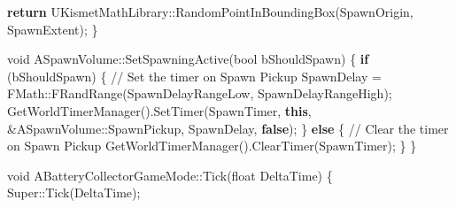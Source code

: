 \documentclass[
  letterpaper,
  DIV=11,
  numbers=noendperiod]{scrartcl}
\newenvironment{Shaded}{\begin{snugshade}}{\end{snugshade}}
\newcommand{\CommentTok}[1]{\textcolor[rgb]{0.37,0.37,0.37}{#1}}
\newcommand{\ControlFlowTok}[1]{\textcolor[rgb]{0.00,0.23,0.31}{\textbf{#1}}}
\newcommand{\DataTypeTok}[1]{\textcolor[rgb]{0.68,0.00,0.00}{#1}}
\newcommand{\KeywordTok}[1]{\textcolor[rgb]{0.00,0.23,0.31}{\textbf{#1}}}
\newcommand{\NormalTok}[1]{\textcolor[rgb]{0.00,0.23,0.31}{#1}}
\newcommand{\OperatorTok}[1]{\textcolor[rgb]{0.37,0.37,0.37}{#1}}
\begin{document}
\begin{Shaded}
\begin{Highlighting}[]
    \ControlFlowTok{return}\NormalTok{ UKismetMathLibrary}\OperatorTok{::}\NormalTok{RandomPointInBoundingBox}\OperatorTok{(}\NormalTok{SpawnOrigin}\OperatorTok{,}\NormalTok{ SpawnExtent}\OperatorTok{);}
\OperatorTok{\}}

\DataTypeTok{void}\NormalTok{ ASpawnVolume}\OperatorTok{::}\NormalTok{SetSpawningActive}\OperatorTok{(}\DataTypeTok{bool}\NormalTok{ bShouldSpawn}\OperatorTok{)}
\OperatorTok{\{}
    \ControlFlowTok{if} \OperatorTok{(}\NormalTok{bShouldSpawn}\OperatorTok{)}
    \OperatorTok{\{}
        \CommentTok{// Set the timer on Spawn Pickup}
\NormalTok{        SpawnDelay }\OperatorTok{=}\NormalTok{ FMath}\OperatorTok{::}\NormalTok{FRandRange}\OperatorTok{(}\NormalTok{SpawnDelayRangeLow}\OperatorTok{,}\NormalTok{ SpawnDelayRangeHigh}\OperatorTok{);}
\NormalTok{        GetWorldTimerManager}\OperatorTok{().}\NormalTok{SetTimer}\OperatorTok{(}\NormalTok{SpawnTimer}\OperatorTok{,} \KeywordTok{this}\OperatorTok{,} \OperatorTok{\&}\NormalTok{ASpawnVolume}\OperatorTok{::}\NormalTok{SpawnPickup}\OperatorTok{,}\NormalTok{ SpawnDelay}\OperatorTok{,} \KeywordTok{false}\OperatorTok{);}
    \OperatorTok{\}}
    \ControlFlowTok{else}
    \OperatorTok{\{}
        \CommentTok{// Clear the timer on Spawn Pickup}
\NormalTok{        GetWorldTimerManager}\OperatorTok{().}\NormalTok{ClearTimer}\OperatorTok{(}\NormalTok{SpawnTimer}\OperatorTok{);}
    \OperatorTok{\}}
\OperatorTok{\}}

\DataTypeTok{void}\NormalTok{ ABatteryCollectorGameMode}\OperatorTok{::}\NormalTok{Tick}\OperatorTok{(}\DataTypeTok{float}\NormalTok{ DeltaTime}\OperatorTok{)}
\OperatorTok{\{}
\NormalTok{    Super}\OperatorTok{::}\NormalTok{Tick}\OperatorTok{(}\NormalTok{DeltaTime}\OperatorTok{);}
    

\end{Highlighting}
\end{Shaded}
\end{document}
